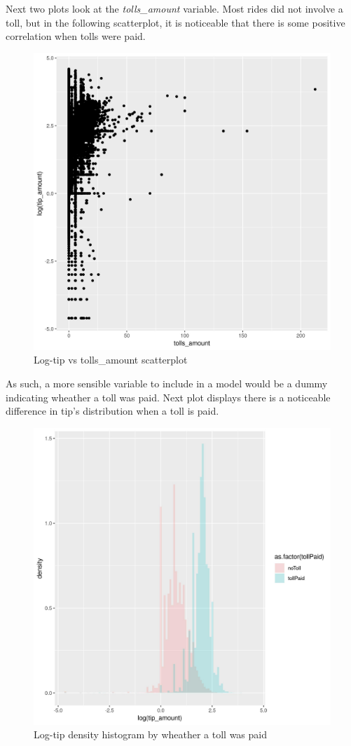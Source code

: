 \documentclass[11pt]{article}
\begin{document}
Next two plots look at the \emph{tolls\_amount} variable. Most rides did not
involve a toll, but in the following scatterplot, it is noticeable
that there is some positive correlation when tolls were paid.
\begin{figure}[htbp]
\centering
\includegraphics[width=.9\linewidth]{./plots/tollsTipPlot.jpg}
\caption{\label{fig:orgc806998}
Log-tip vs tolls\_amount scatterplot}
\end{figure}

As such, a more sensible variable to include in a model would be a dummy
indicating wheather a toll was paid. Next plot displays there is a
noticeable difference in tip's distribution when a toll is paid.
\begin{figure}[htbp]
\centering
\includegraphics[width=.9\linewidth]{./plots/tollsTipDensityHist.jpg}
\caption{\label{fig:org7e6f626}
Log-tip density histogram by wheather a toll was paid}
\end{figure}
\end{document}
